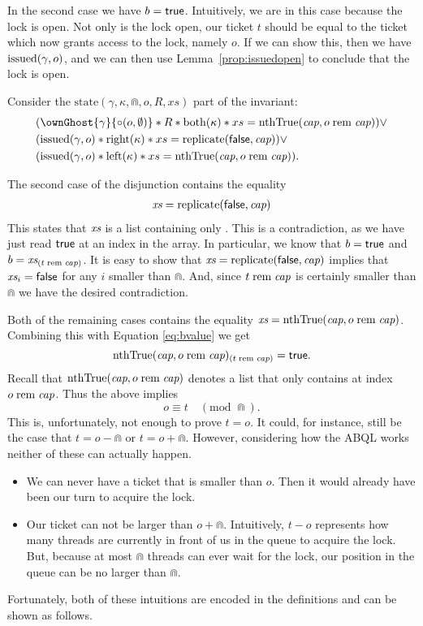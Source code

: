 In the second case we have $b = \textsf{true}$. Intuitively, we are in this case because
the lock is open. Not only is the lock open, our ticket $t$ should be equal to
the ticket which now grants access to the lock, namely $o$. If we can show this,
then we have $\text{issued}(\gamma, o)$, and we can then use Lemma~\ref{prop:issuedopen} to
conclude that the lock is open.

Consider the $\text{state}(\gamma, \kappa, \Cap, o, R, xs)$ part of the
invariant:
\begin{align*}
        & (\ownGhost{\gamma}{\circ (o, \emptyset)} \ast R \ast \bothK \ast xs = \nthTrueCapO) \lor \\
        & (\issuedA \ast \rightK \ast xs = \replicate(\false, \Cap)) \lor \\
        & (\issuedA \ast \leftK \ast xs = \nthTrueCapO).
\end{align*}

The second case of the disjunction contains the equality
\begin{align*}
  \textit{xs} = \operatorname{replicate}(\textsf{false}, \textit{cap})
\end{align*}
This states that $\textit{xs}$ is a list containing only \false. This is a
contradiction, as we have just read $\textsf{true}$ at an index in the array. In
particular, we know that $b = \textsf{true}$ and $b = \textit{xs}_{(t \;\mathrm{rem}\; \textit{cap})}$. It is easy
to show that $\textit{xs} = \operatorname{replicate}(\textsf{false}, \textit{cap})$ implies that $\textit{xs}_i = \textsf{false}$ for
any $i$ smaller than $\Cap$. And, since $t \;\mathrm{rem}\; \textit{cap}$ is certainly smaller than
$\Cap$ we have the desired contradiction.

Both of the remaining cases contains the equality $\textit{xs} = \text{nthTrue}(\textit{cap}, o \;\mathrm{rem}\; \textit{cap})$.
Combining this with Equation \ref{eq:bvalue} we get
\[
  \text{nthTrue}(\textit{cap}, o \;\mathrm{rem}\; \textit{cap})_{(t \;\mathrm{rem}\; \textit{cap})} = \textsf{true}.
\]
Recall that $\text{nthTrue}(\textit{cap}, o \;\mathrm{rem}\; \textit{cap})$ denotes a list that only contains \true{} at index $o \;\mathrm{rem}\; \textit{cap}$.
Thus the above implies
\begin{equation} \label{eq:otremeq}
  o \equiv t \quad (\text{mod } \Cap).
\end{equation}
This is, unfortunately, not enough to prove $t = o$. It could, for instance,
still be the case that $t = o - \Cap$ or $t = o + \Cap$. However, considering
how the ABQL works neither of these can actually happen.
\begin{itemize}
  \item We can never have a ticket that is smaller than $o$. Then it would
    already have been our turn to acquire the lock.
  \item Our ticket can not be larger than $o + \Cap$. Intuitively, $t - o$
    represents how many threads are currently in front of us in the queue to
    acquire the lock. But, because at most $\Cap$ threads can ever wait for the
    lock, our position in the queue can be no larger than $\Cap$.
\end{itemize}
Fortunately, both of these intuitions are encoded in the definitions and can be
shown as follows.

